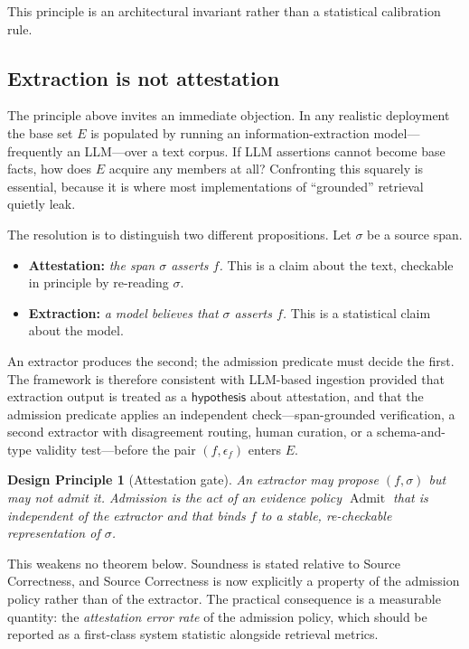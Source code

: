 \documentclass[11pt]{article}
\newtheorem{principle}[definition]{Design Principle}
\begin{document}
This principle is an architectural invariant rather than a statistical calibration rule.

\subsection{Extraction is not attestation}
\label{sec:extraction}

The principle above invites an immediate objection. In any realistic deployment the base set $E$ is populated by running an information-extraction model---frequently an LLM---over a text corpus. If LLM assertions cannot become base facts, how does $E$ acquire any members at all? Confronting this squarely is essential, because it is where most implementations of ``grounded'' retrieval quietly leak.

The resolution is to distinguish two different propositions. Let $\sigma$ be a source span.
\begin{itemize}[leftmargin=*]
    \item \textbf{Attestation:} \emph{the span $\sigma$ asserts $f$.} This is a claim about the text, checkable in principle by re-reading $\sigma$.
    \item \textbf{Extraction:} \emph{a model believes that $\sigma$ asserts $f$.} This is a statistical claim about the model.
\end{itemize}
An extractor produces the second; the admission predicate must decide the first. The framework is therefore consistent with LLM-based ingestion provided that extraction output is treated as a $\mathsf{hypothesis}$ about attestation, and that the admission predicate applies an independent check---span-grounded verification, a second extractor with disagreement routing, human curation, or a schema-and-type validity test---before the pair $(f,\epsilon_f)$ enters $E$.

\begin{principle}[Attestation gate]
\label{prin:attestation}
An extractor may propose $(f,\sigma)$ but may not admit it. Admission is the act of an evidence policy $\operatorname{Admit}$ that is independent of the extractor and that binds $f$ to a stable, re-checkable representation of $\sigma$.
\end{principle}

This weakens no theorem below. Soundness is stated relative to Source Correctness, and Source Correctness is now explicitly a property of the admission policy rather than of the extractor. The practical consequence is a measurable quantity: the \emph{attestation error rate} of the admission policy, which should be reported as a first-class system statistic alongside retrieval metrics.
\end{document}
